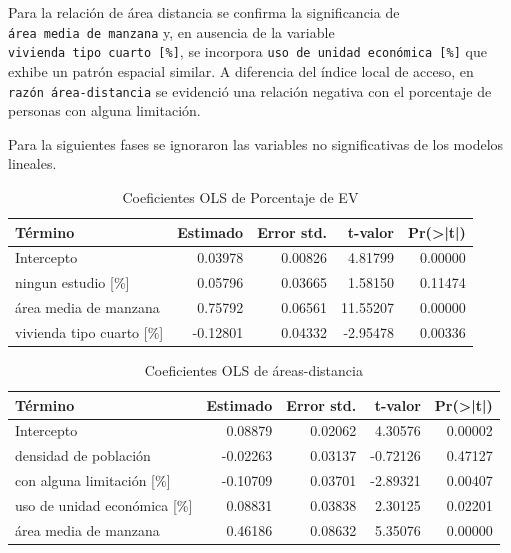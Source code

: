 \documentclass[12pt,a4paper,oneside, openany]{book}
\theoremstyle{definition}
\theoremstyle{definition}
\theoremstyle{definition}
\theoremstyle{remark}
\begin{document}
Para la relación de área distancia se confirma la significancia de
\texttt{área\ media\ de\ manzana} y, en ausencia de la variable
\texttt{vivienda\ tipo\ cuarto\ {[}\%{]}}, se incorpora
\texttt{uso\ de\ unidad\ económica\ {[}\%{]}} que exhibe un patrón
espacial similar. A diferencia del índice local de acceso, en
\texttt{razón\ área-distancia} se evidenció una relación negativa con el
porcentaje de personas con alguna limitación.

Para la siguientes fases se ignoraron las variables no significativas de
los modelos lineales.

\begin{table}[H]

\caption{\label{tab:coef-lm-ptjeAEV}Coeficientes OLS de Porcentaje de EV}
\centering
\begin{tabular}{lrrrr}
\toprule
Término & Estimado & Error std. & t-valor & Pr(>|t|)\\
\midrule
Intercepto & 0.03978 & 0.00826 & 4.81799 & 0.00000\\
ningun estudio [\%] & 0.05796 & 0.03665 & 1.58150 & 0.11474\\
área media de manzana & 0.75792 & 0.06561 & 11.55207 & 0.00000\\
vivienda tipo cuarto [\%] & -0.12801 & 0.04332 & -2.95478 & 0.00336\\
\bottomrule
\end{tabular}
\end{table}

\begin{table}[H]

\caption{\label{tab:coef-lm-areadist}Coeficientes OLS de áreas-distancia}
\centering
\begin{tabular}{lrrrr}
\toprule
Término & Estimado & Error std. & t-valor & Pr(>|t|)\\
\midrule
Intercepto & 0.08879 & 0.02062 & 4.30576 & 0.00002\\
densidad de población & -0.02263 & 0.03137 & -0.72126 & 0.47127\\
con alguna limitación [\%] & -0.10709 & 0.03701 & -2.89321 & 0.00407\\
uso de unidad económica [\%] & 0.08831 & 0.03838 & 2.30125 & 0.02201\\
área media de manzana & 0.46186 & 0.08632 & 5.35076 & 0.00000\\
\bottomrule
\end{tabular}
\end{table}
\end{document}
